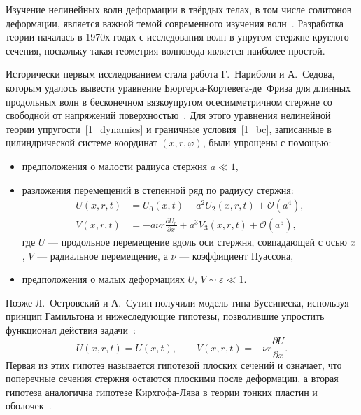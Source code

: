 \documentclass[12pt, a4paper]{report}
\newcommand{\pdiff}[2]{\frac{\partial #1}{\partial #2}}
\begin{document}
Изучение нелинейных волн деформации в твёрдых телах, в том числе солитонов деформации, является важной темой современного изучения волн~\cite{S_book, P_book}.
Разработка теории началась в 1970х годах с исследования волн в упругом стержне круглого сечения, поскольку такая геометрия волновода является наиболее простой.

Исторически первым исследованием стала работа Г.~Нариболи и А.~Седова, которым удалось вывести уравнение Бюргерса-Кортевега-де~Фриза для длинных продольных волн в бесконечном вязкоупругом осесимметричном стержне со свободной от напряжений поверхностью~\cite{NS}. Для этого уравнения нелинейной теории упругости~\eqref{1_dynamics} и граничные условия~\eqref{1_bc}, записанные в цилиндрической системе координат $(x,r,\varphi)$, были упрощены с помощью:
\begin{itemize}[noitemsep,topsep=1pt]
	\item предположения о малости радиуса стержня $a \ll 1$,
	\item разложения перемещений в степенной ряд по радиусу стержня: 
	\begin{align}\label{1_nariboli}
	U(x,r,t) &= U_0(x,t) + a^2 U_2(x,r,t) + \mathcal{O}(a^4),\\
	V(x,r,t) &= -a \nu r \pdiff{U_0}{x} + a^3 V_3(x,r,t) + \mathcal{O}(a^5),
	\end{align}
	где $U$ --- продольное перемещение вдоль оси стержня, совпадающей с осью $x$, $V$ --- радиальное перемещение, а $\nu$ --- коэффициент Пуассона,
	\item предположения о малых деформациях $U, \, V \sim \varepsilon \ll 1$.
\end{itemize}
Позже Л.~Островский и А.~Сутин получили модель типа Буссинеска, %
используя принцип Гамильтона и нижеследующие гипотезы, позволившие упростить функционал действия задачи~\cite{OS}: 
\begin{equation}\label{1_ostrovsky_hyp}
U(x,r,t) = U(x,t), \qquad V(x,r,t) = -\nu r \pdiff U x.
\end{equation}
Первая из этих гипотез называется гипотезой плоских сечений и означает, что поперечные сечения стержня остаются плоскими после деформации, а вторая гипотеза аналогична гипотезе Кирхгофа-Лява в теории тонких пластин и оболочек~\cite{Love}.
\end{document}
